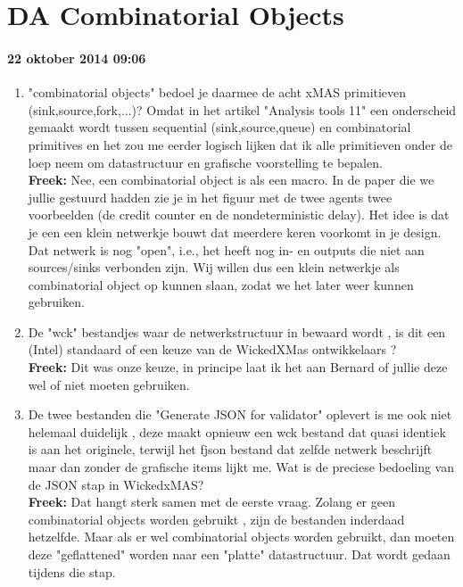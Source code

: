\section{DA Combinatorial Objects}

\paragraph{22 oktober 2014 09:06}

\begin{enumerate}
\item "combinatorial objects" bedoel je daarmee de acht xMAS primitieven (sink,source,fork,...)? Omdat in het artikel "Analysis tools 11" een onderscheid gemaakt wordt tussen sequential (sink,source,queue) en combinatorial primitives en het zou me eerder logisch lijken dat ik alle primitieven onder de loep neem om datastructuur en grafische voorstelling te bepalen.
\\
\textbf{Freek:} Nee, een combinatorial object is als een macro. In de paper die we jullie gestuurd hadden zie je in het figuur met de twee agents twee voorbeelden (de credit counter en de nondeterministic delay). Het idee is dat je een een klein netwerkje bouwt dat meerdere keren voorkomt in je design. Dat netwerk is nog "open", i.e., het heeft nog in- en outputs die niet aan sources/sinks verbonden zijn. Wij willen dus een klein netwerkje als combinatorial object op kunnen slaan, zodat we het later weer kunnen gebruiken.

\item De "wck" bestandjes waar de netwerkstructuur in bewaard wordt , is dit een (Intel) standaard of een keuze van de WickedXMas ontwikkelaars ?  
\\
\textbf{Freek:} Dit was onze keuze, in principe laat ik het aan Bernard of jullie deze wel of niet moeten gebruiken.

\item De twee bestanden die "Generate JSON for validator" oplevert is me ook niet helemaal duidelijk , deze maakt opnieuw een wck bestand dat quasi identiek is aan het originele, terwijl het fjson bestand dat zelfde netwerk beschrijft maar dan zonder de grafische items lijkt me. Wat is de preciese bedoeling van de JSON stap in WickedxMAS? 
\\
\textbf{Freek:} Dat hangt sterk samen met de eerste vraag. Zolang er geen combinatorial objects worden gebruikt , zijn de bestanden inderdaad hetzelfde. Maar als er wel combinatorial objects worden gebruikt, dan moeten deze "geflattened" worden naar een "platte" datastructuur. Dat wordt gedaan tijdens die stap.


\end{enumerate}


